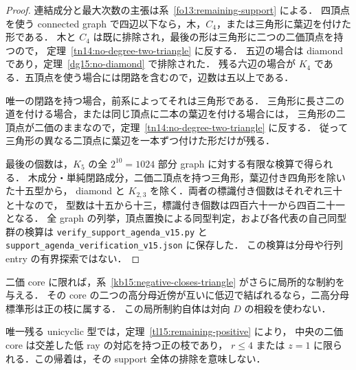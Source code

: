 \begin{proof}
連結成分と最大次数の主張は系~\ref{fo13:remaining-support} による．
四頂点を使う connected graph で四辺以下なら，木，$C_4$，または三角形に葉辺を付けた形である．
木と $C_4$ は既に排除され，最後の形は三角形に二つの二価頂点を持つので，
定理~\ref{tn14:no-degree-two-triangle} に反する．
五辺の場合は diamond であり，定理~\ref{dg15:no-diamond} で排除された．
残る六辺の場合が $K_4$ である．五頂点を使う場合には閉路を含むので，辺数は五以上である．

唯一の閉路を持つ場合，前系によってそれは三角形である．
三角形に長さ二の道を付ける場合，または同じ頂点に二本の葉辺を付ける場合には，
三角形の二頂点が二価のままなので，定理~\ref{tn14:no-degree-two-triangle} に反する．
従って三角形の異なる二頂点に葉辺を一本ずつ付けた形だけが残る．

最後の個数は，$K_5$ の全 $2^{10}=1024$ 部分 graph に対する有限な検算で得られる．
木成分・単純閉路成分，二価二頂点を持つ三角形，葉辺付き四角形を除いた十五型から，
diamond と $K_{2,3}$ を除く．両者の標識付き個数はそれぞれ三十と十なので，
型数は十五から十三，標識付き個数は四百六十一から四百二十一となる．
全 graph の列挙，頂点置換による同型判定，および各代表の自己同型群の検算は
\nolinkurl{verify_support_agenda_v15.py} と
\nolinkurl{support_agenda_verification_v15.json} に保存した．
この検算は分母や行列 entry の有界探索ではない．
\end{proof}

二価 core に限れば，系~\ref{kb15:negative-closes-triangle} がさらに局所的な制約を与える．
その core の二つの高分母近傍が互いに低辺で結ばれるなら，二高分母標準形は正の枝に属する．
この局所制約自体は対向 $D$ の相殺を使わない．

唯一残る unicyclic 型では，定理~\ref{tl15:remaining-positive} により，
中央の二価 core は交差した低 ray の対応を持つ正の枝であり，
$r\leq4$ または $z=1$ に限られる．この帰着は，その support 全体の排除を意味しない．

